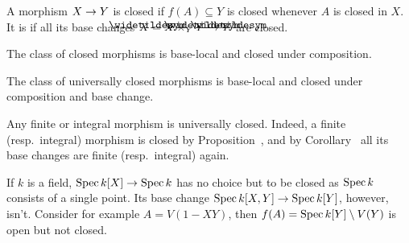 \documentclass[a4paper,parskip=half,numbers=enddot, DIV=12]{scrreprt}
\begin{document}
\begin{defi}
    A morphism $X\morphism Y$ is closed if $f(A)\subseteq Y$ is closed whenever $A$ is closed in $X$. It is  if all its base changes $\snake X = X\times_Y \snake Y \morphism \snake Y$ are closed.
\end{defi}
\begin{rem}
    \begin{alphanumerate}
    \item {}
        The class of closed morphisms is base-local and closed under composition.
    \item  
        The class of universally closed morphisms is base-local and closed under composition and base change.
    \item 
        Any finite or integral morphism is universally closed. Indeed, a finite (resp.\ integral) morphism is closed by Proposition~, and by Corollary~ all its base changes are finite (resp.\ integral) again.
    \end{alphanumerate}
\end{rem}
\begin{example}
	If $k$ is a field, $\Spec k[X]\morphism\Spec k$ has no choice but to be closed as $\operatorname{Spec} k$ consists of a single point. Its base change $\Spec k[X,Y]\morphism\Spec k[Y]$, however, isn't. Consider for example $A=V(1-XY)$, then $f(A)=\operatorname{Spec} k[Y]\setminus V(Y)$ is open but not closed.
\end{example}
\end{document}
